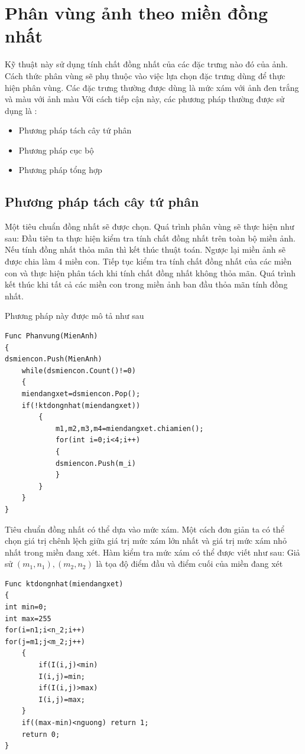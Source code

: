 \documentclass[14pt,oneside,a4paper]{extreport}
\begin{document}
\section{Phân vùng ảnh theo miền đồng nhất}
Kỹ thuật này sử dụng tính chất đồng nhất của các đặc trưng nào đó của ảnh. Cách thức phân vùng sẽ phụ thuộc vào việc lựa chọn đặc trưng dùng để thực hiện phân vùng. Các đặc trưng thường được dùng là mức xám với ảnh đen trắng và màu với ảnh màu
Với cách tiếp cận này, các phương pháp thường được sử dụng là :
\begin{itemize}
\item  Phương pháp tách cây tứ phân
\item Phương pháp cục bộ
\item Phương pháp tổng hợp
\end{itemize}
\subsection{Phương pháp tách cây tứ phân}
Một tiêu chuẩn đồng nhất sẽ được chọn. Quá trình phân vùng sẽ thực hiện như sau: Đầu tiên ta thực hiện kiểm tra tính chất đồng nhất trên toàn bộ miền ảnh. Nếu tính đồng nhất thỏa mãn thì kết thúc thuật toán. Ngược lại miền ảnh sẽ được chia làm 4 miền con. Tiếp tục kiểm tra tính chất đồng nhất của các miền con và thực hiện phân tách khi tính chất đồng nhất không thỏa mãn. Quá trình kết thúc khi tất cả các miền con trong miền ảnh ban đầu thỏa mãn tính đồng nhất.

Phương pháp này được mô tả như sau
\begin{lstlisting}
Func Phanvung(MienAnh)
{
dsmiencon.Push(MienAnh)
	while(dsmiencon.Count()!=0)
	{
	miendangxet=dsmiencon.Pop();
	if(!ktdongnhat(miendangxet))
		{
			m1,m2,m3,m4=miendangxet.chiamien();
			for(int i=0;i<4;i++)
			{
			dsmiencon.Push(m_i)
			}
		}
	}
}
\end{lstlisting}

Tiêu chuẩn đồng nhất có thể dựa vào mức xám. Một cách đơn giản ta có thể chọn giá trị chênh lệch giữa giá trị mức xám lớn nhất và giá trị mức xám nhỏ nhất trong miền đang xét. Hàm kiểm tra mức xám có thể được viết như sau: Giả sử $(m_1,n_1), (m_2,n_2)$ là tọa độ điểm đầu và điểm cuối của miền đang xét
\begin{lstlisting}
Func ktdongnhat(miendangxet)
{
int min=0;
int max=255
for(i=n1;i<n_2;i++)
for(j=m1;j<m_2;j++)
	{
		if(I(i,j)<min)
		I(i,j)=min;
		if(I(i,j)>max)
		I(i,j)=max;
	}
	if((max-min)<nguong) return 1;
	return 0;
}
\end{lstlisting}
\end{document}
